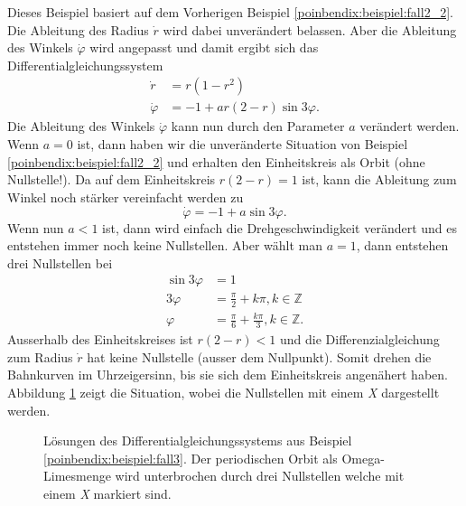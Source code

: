 \begin{beispiel} \label{poinbendix:beispiel:fall3}

Dieses Beispiel basiert auf dem Vorherigen Beispiel \ref{poinbendix:beispiel:fall2_2}.
Die Ableitung des Radius $\dot{r}$ wird dabei unverändert belassen.
Aber die Ableitung des Winkels $\dot{\varphi}$ wird angepasst und damit ergibt sich das Differentialgleichungssystem
\begin{align*}
    \dot{r}       &= r(1-r^2) \\
    \dot{\varphi} &= -1 + ar(2-r) \sin 3\varphi.
\end{align*}
Die Ableitung des Winkels $\dot{\varphi}$ kann nun durch den Parameter $a$ verändert werden.
Wenn $a=0$ ist, dann haben wir die unveränderte Situation von Beispiel \ref{poinbendix:beispiel:fall2_2} und erhalten den Einheitskreis als Orbit (ohne Nullstelle!).
Da auf dem Einheitskreis $r(2-r)=1$ ist, kann die Ableitung zum Winkel noch stärker vereinfacht werden zu
\begin{equation*}
    \dot{\varphi} = -1 + a \sin 3\varphi.
\end{equation*}
Wenn nun $a<1$ ist, dann wird einfach die Drehgeschwindigkeit verändert und es entstehen immer noch keine Nullstellen.
Aber wählt man $a=1$, dann entstehen drei Nullstellen bei
\begin{align*}
    \sin 3\varphi &= 1 \\
    3\varphi &= \frac{\pi}{2} + k\pi, k \in \mathbb{Z} \\
    \varphi &= \frac{\pi}{6} + \frac{k\pi}{3}, k \in \mathbb{Z}.
\end{align*}
Ausserhalb des Einheitskreises ist $r(2-r)<1$ und die Differenzialgleichung zum Radius $\dot{r}$ hat keine Nullstelle (ausser dem Nullpunkt).
Somit drehen die Bahnkurven im Uhrzeigersinn, bis sie sich dem Einheitskreis angenähert haben.
Abbildung \ref{poinbendix:fig:fall_3} zeigt die Situation, wobei die Nullstellen mit einem \textit{X} dargestellt werden.
\begin{figure}
\centering
    
    \caption{Lösungen des Differentialgleichungssystems aus Beispiel \ref{poinbendix:beispiel:fall3}.
    Der periodischen Orbit als Omega-Limesmenge wird unterbrochen durch drei Nullstellen welche mit einem \textit{X} markiert sind.}
\label{poinbendix:fig:fall_3}
\end{figure}

\end{beispiel}
